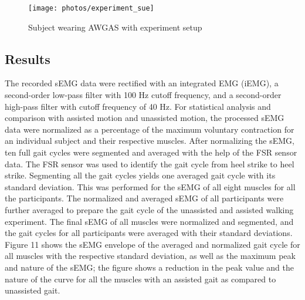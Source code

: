 \documentclass[paper,JRM,paper]{jaciiiarticle}
\begin{document}
\begin{figure}[h]
	\centering
	\texttt{[image: photos/experiment\_sue]}
	\caption{Subject wearing AWGAS with experiment setup}
	\label{fig:experiment}
\end{figure}

\subsection{Results}
The recorded sEMG data were rectified with an integrated EMG (iEMG), a second-order low-pass filter with 100 Hz cutoff frequency, and a second-order high-pass filter with cutoff frequency of 40 Hz. For statistical analysis and comparison with assisted motion and unassisted motion, the processed sEMG data were normalized as a percentage of the maximum voluntary contraction for an individual subject and their respective muscles. After normalizing the sEMG, ten full gait cycles were segmented and averaged with the help of the FSR sensor data. The FSR sensor was used to identify the gait cycle from heel strike to heel strike. Segmenting all the gait cycles yields one averaged gait cycle with its standard deviation. This was performed for the sEMG of all eight muscles for all the participants. The normalized and averaged sEMG of all participants were further averaged to prepare the gait cycle of the unassisted and assisted walking experiment. The final sEMG of all muscles were normalized and segmented, and the gait cycles for all participants were averaged with their standard deviations. Figure 11 shows the sEMG envelope of the averaged and normalized gait cycle for all muscles with the respective standard deviation, as well as the maximum peak and nature of the sEMG; the figure shows a reduction in the peak value and the nature of the curve for all the muscles with an assisted gait as compared to unassisted gait.
\end{document}
